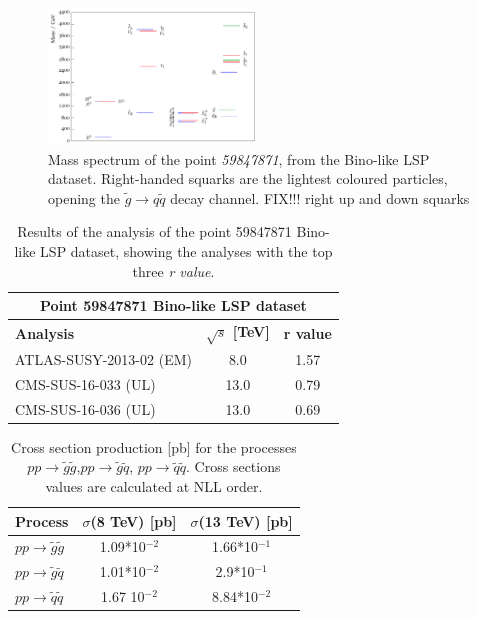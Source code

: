 \documentclass[a4paper,11pt]{article}
\newcommand{\RVALUE}{\textit{r value}}
\begin{document}
%
%
\begin{figure}
	\begin{center}		
		\includegraphics[width=0.49\textwidth]{PLOTS/13TeV/59847871.pdf}
	\end{center}
	\caption{Mass spectrum of the point \textit{59847871}, from the Bino-like LSP dataset. Right-handed squarks are the lightest coloured particles, opening the $\tilde g \rightarrow q \tilde q $ decay channel. {\color{blue} FIX!!! right up and down squarks}} 
	\label{pyslha}
\end{figure}
%
%

\begin{table}[!h]
	\footnotesize
	\begin{center}
		\renewcommand{\arraystretch}{1.3}
		\begin{tabular}{ l c c}  \toprule \toprule
			\multicolumn{3}{c}{Point 59847871 Bino-like LSP dataset} \\ \toprule 
			\textbf{Analysis} & \textbf{$\sqrt{s}$ [TeV]}  & \textbf{r value} \\  \toprule
			ATLAS-SUSY-2013-02 (EM) & 8.0  &  1.57 \\
			CMS-SUS-16-033 (UL) & 13.0 & 0.79 \\
			CMS-SUS-16-036 (UL) & 13.0 & 0.69 \\
			\bottomrule
		\end{tabular}
	\end{center}
	\caption{Results of the analysis of the point 59847871 Bino-like LSP dataset, showing the analyses with the top three \RVALUE. }
	\label{tab_13tev}
\end{table}
%
%
\begin{table}[!h]
	\footnotesize
	\begin{center}
		\renewcommand{\arraystretch}{1.3}
		\begin{tabular}{ l c c}  \toprule \toprule
			\textbf{Process} & $\sigma$(8 TeV) [pb]  & $\sigma$(13 TeV) [pb] \\  \toprule
			$pp \rightarrow \tilde g \tilde g$ & 1.09*10$^{-2}$ & 1.66*10$^{-1}$\\
			$pp \rightarrow \tilde g \tilde q$ & 1.01*10$^{-2}$ &  2.9*10$^{-1}$ \\
			$pp \rightarrow \tilde q \tilde q$ & 1.67 10$^{-2}$ & 8.84*10$^{-2}$ \\
			\bottomrule
		\end{tabular}
	\end{center}
	\caption{Cross section production [pb] for the processes $pp \rightarrow \tilde g \tilde g$,$pp \rightarrow \tilde g \tilde q$, $pp \rightarrow \tilde q \tilde q$. Cross sections values are calculated at NLL order.}
	\label{cross_sections}
\end{table}
\end{document}
